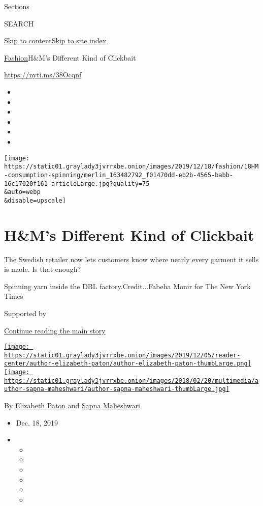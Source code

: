 Sections

SEARCH

\protect\hyperlink{site-content}{Skip to
content}\protect\hyperlink{site-index}{Skip to site index}

\href{/section/fashion}{Fashion}\textbar{}H\&M's Different Kind of
Clickbait

\href{https://nyti.ms/38Ocqnf}{https://nyti.ms/38Ocqnf}

\begin{itemize}
\item
\item
\item
\item
\item
\item
\end{itemize}

\texttt{[image: https://static01.graylady3jvrrxbe.onion/images/2019/12/18/fashion/18HM-consumption-spinning/merlin\_163482792\_f01470dd-eb2b-4565-babb-16c17020f161-articleLarge.jpg?quality=75\\\&auto=webp\\\&disable=upscale]}

\hypertarget{hms-different-kind-of-clickbait}{%
\section{H\&M's Different Kind of
Clickbait}\label{hms-different-kind-of-clickbait}}

The Swedish retailer now lets customers know where nearly every garment
it sells is made. Is that enough?

Spinning yarn inside the DBL factory.Credit...Fabeha Monir for The New
York Times

Supported by

\protect\hyperlink{after-sponsor}{Continue reading the main story}

\href{https://www.nytimes3xbfgragh.onion/by/elizabeth-paton}{\texttt{[image: https://static01.graylady3jvrrxbe.onion/images/2019/12/05/reader-center/author-elizabeth-paton/author-elizabeth-paton-thumbLarge.png]}}\href{https://www.nytimes3xbfgragh.onion/by/sapna-maheshwari}{\texttt{[image: https://static01.graylady3jvrrxbe.onion/images/2018/02/20/multimedia/author-sapna-maheshwari/author-sapna-maheshwari-thumbLarge.jpg]}}

By
\href{https://www.nytimes3xbfgragh.onion/by/elizabeth-paton}{Elizabeth
Paton} and
\href{https://www.nytimes3xbfgragh.onion/by/sapna-maheshwari}{Sapna
Maheshwari}

\begin{itemize}
\item
  Dec. 18, 2019
\item
  \begin{itemize}
  \item
  \item
  \item
  \item
  \item
  \item
  \end{itemize}
\end{itemize}

